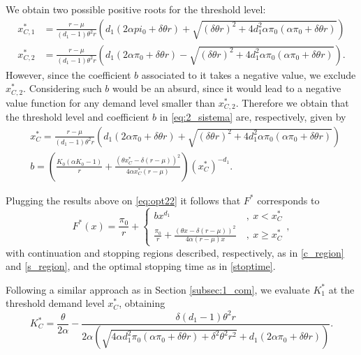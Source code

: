 We obtain two possible positive roots for the threshold level:
\begin{align*}
x^*_{C,1}&=\frac{r-\mu}{(d_1-1) \theta ^2 r}
\left(
d_1 \left(2 \alpha pi_0 + \delta  \theta  r \right) +
\sqrt{(\delta  \theta  r)^2 + 4 d_1^2 \alpha \pi_0 \left( \alpha \pi_0 +\delta  \theta  r \right)} \right)\\
x^*_{C,2}&=\frac{r-\mu}{(d_1-1) \theta ^2 r}
\left(
d_1 \left(2 \alpha \pi_0 + \delta  \theta  r \right) -
\sqrt{(\delta  \theta  r)^2 + 4 d_1^2 \alpha \pi_0 \left( \alpha \pi_0 +\delta  \theta  r \right)} \right).
\end{align*}
However, since the coefficient $b$ associated to it takes a negative value, we exclude $x^*_{C,2}$. Considering such $b$ would be an absurd, since it would lead to a negative value function for any demand level smaller than $x^*_{C,2}$. Therefore we obtain that the threshold level and coefficient $b$ in \eqref{eq:2_sistema} are, respectively, given by
\begin{align}
&x_C^*=\frac{r-\mu}{(d_1-1) \theta ^2 r}
\left(
d_1 \left(2 \alpha \pi_0 + \delta  \theta  r \right) +
\sqrt{(\delta  \theta  r)^2 + 4 d_1^2 \alpha \pi_0 \left( \alpha \pi_0 +\delta  \theta  r \right)} \right) \label{eq:prob2_xC}\\
&b=\left( \frac{K_0 (\alpha  K_0-1)}{r}+\frac{(\theta  x^*_C-\delta  (r-\mu ))^2}{4 \alpha  x^*_C (r-\mu )} \right)(x_C^*)^{-d_1}. \nonumber
\end{align}

Plugging the results above on \eqref{eq:opt22} it follows that $F^*$ corresponds to
\begin{equation}
F^*(x)=\frac{\pi_0}{r}+\begin{cases} b x^{d_1}  &\ , \ x < x_C^* \\
\frac{\pi_0}{r}+ \frac{(\theta x -\delta (r-\mu))^2}{4 \alpha (r-\mu) x} &\ , \ x \geq  x_C^*
\end{cases},
\label{2_V*2}
\end{equation}
with continuation and stopping regions described, respectively, as in \eqref{c_region} and \eqref{s_region}, and the optimal stopping time as in \eqref{stoptime}.


Following a similar approach as in Section \ref{subsec:1_com}, we evaluate $K^*_1$ at the threshold demand level $x_C^*$, obtaining
\begin{equation}
K^*_C=\frac{\theta }{2 \alpha }-\frac{\delta  (d_1-1) \theta ^2 r}{2 \alpha  \left(\sqrt{4 \alpha  d_1^2 \pi_0 (\alpha  \pi_0+\delta  \theta  r)+\delta ^2 \theta ^2 r^2}+d_1 (2 \alpha  \pi_0+\delta  \theta  r)\right)}.
\label{3_K*}
\end{equation}


